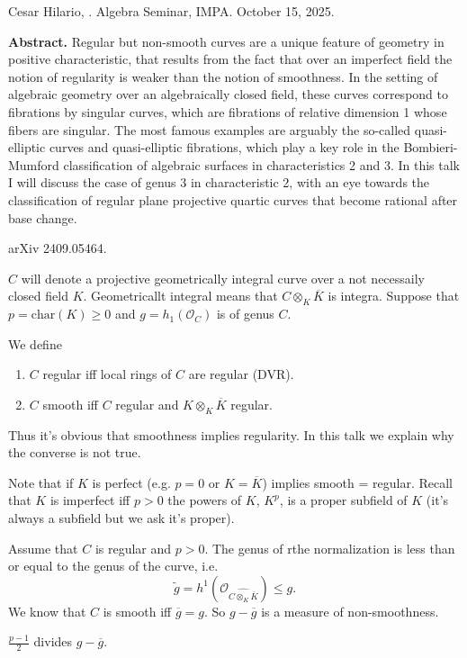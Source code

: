 \noindent
Cesar Hilario, .
Algebra Seminar, IMPA.
October 15, 2025.

\medskip\noindent
{\bf Abstract.} Regular but non-smooth curves
are a unique feature of
geometry in positive characteristic, that
results from the fact that over an
imperfect field the notion of regularity is
weaker than the notion of
smoothness. In the setting of algebraic
geometry over an algebraically closed
field, these curves correspond to fibrations
by singular curves, which are
fibrations of relative dimension 1 whose
fibers are singular. The most famous
examples are arguably the so-called
quasi-elliptic curves and quasi-elliptic
fibrations, which play a key role in the
Bombieri-Mumford classification of
algebraic surfaces in characteristics 2 and
3. In this talk I will discuss the
case of genus 3 in characteristic 2, with an
eye towards the classification of
regular plane projective quartic curves that
become rational after base change.

\medskip\noindent
arXiv 2409.05464.

\medskip\noindent
$C$ will denote a projective geometrically
integral curve over
a not necessaily closed field $K$.
Geometricallt integral
means that $C \otimes_K \overline{K}$ is
integra.
Suppose that $p=\text{char}(K) \geq 0$
and $g=h_1(\mathcal{O}_C)$ is of genus $C$.

We define
\begin{enumerate}
\item $C$ regular iff local rings of $C$ are
regular (DVR).
\item $C$ smooth iff $C$ regular and $K
\otimes_K \overline{K}$ regular.
\end{enumerate}

\noindent
Thus it's obvious that smoothness implies
regularity.
In this talk we explain why the converse is
not true.

Note that if $K$ is perfect (e.g. $p=0$ or
$K=\overline{K}$) implies
 smooth = regular. Recall that $K$ is
 imperfect iff $p>0$
the powers of $K$, $K^p$, is a proper
subfield of $K$
(it's always a subfield but we ask it's
proper).

\medskip\noindent
Assume that $C$ is regular and $p>0$.
The genus of rthe normalization is less than
or equal to the genus of the curve,
i.e.
$$
\tilde{g}=h^1(\mathcal{O}_{\widehat{C
\otimes_K \overline{K}}})\leq g.
$$
We know that $C$ is smooth iff
$\overline{g}=g$.
So $g-\overline{g}$ is a measure of
non-smoothness.

\begin{theorem}[Tate]
\label{theorem-tate}
$\frac{p-1}{2}$ divides $g-\overline{g}$.
\end{theorem}

